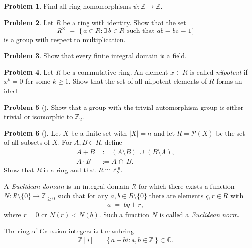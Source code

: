 \documentclass[10pt]{article}
\theoremstyle{definition} %
\newtheorem{problem}{Problem}
\theoremstyle{plain} %
\begin{document}
\begin{problem}
    Find all ring homomorphisms $\psi : \mathbb{Z} \to \mathbb{Z}$.
\end{problem}

\begin{problem}
    Let $R$ be a ring with identity.  Show that the set
    \[
        R^{\times} \;=\; \bigl\{\,a \in R : \exists\,b \in R \text{ such that } ab = ba = 1\bigr\}
    \]
    is a group with respect to multiplication.
\end{problem}

\begin{problem}
    Show that every finite integral domain is a field.
\end{problem}

\begin{problem}
    Let $R$ be a commutative ring.  An element $x \in R$ is called \emph{nilpotent} if $x^{k} = 0$ for some $k \ge 1$.  
    Show that the set of all nilpotent elements of $R$ forms an ideal.
\end{problem}

\begin{problem}[]
    Show that a group with the trivial automorphism group is either trivial or isomorphic to $\mathbb{Z}_2$.
\end{problem}

\begin{problem}[]
    Let $X$ be a finite set with $\lvert X\rvert = n$ and let $R = \mathcal{P}(X)$ be the set of all subsets of $X$.  
    For $A, B \in R$, define
    \begin{align*}
        A + B &:= (A \setminus B) \,\cup\, (B \setminus A), \\
        A \cdot B &:= A \,\cap\, B.
    \end{align*}
    Show that $R$ is a ring and that $R \cong \mathbb{Z}_2^{\,n}$.
\end{problem}
A \emph{Euclidean domain} is an integral domain $R$ for which there exists a function  
$N : R \setminus \{0\} \to \mathbb{Z}_{\ge 0}$ such that for any $a,b \in R \setminus \{0\}$ there are elements
$q,r \in R$ with  
\begin{align}
    a \;=\; bq + r,
\end{align}
where $r = 0$ or $N(r) < N(b)$.  
Such a function $N$ is called a \emph{Euclidean norm}.

The ring of Gaussian integers is the subring  
\begin{align*}
    \mathbb{Z}[i] \;=\; \{\,a + bi : a,b \in \mathbb{Z}\,\} \subset \mathbb{C}.
\end{align*}
\end{document}
